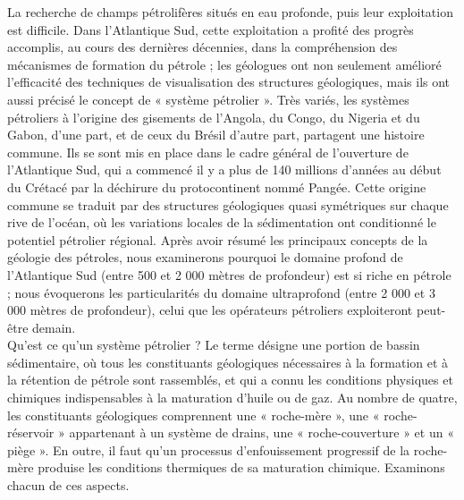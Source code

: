 \documentclass[8pt]{article}
\begin{document}
La recherche de champs pétrolifères situés en eau profonde, puis leur exploitation est difficile. Dans l'Atlantique Sud, cette exploitation a profité des progrès accomplis, au cours des dernières décennies, dans la compréhension des mécanismes de formation du pétrole ; les géologues ont non seulement amélioré l'efficacité des techniques de visualisation des structures géologiques, mais ils ont aussi précisé le concept de « système pétrolier ». Très variés, les systèmes pétroliers à l'origine des gisements de l'Angola, du Congo, du Nigeria et du Gabon, d'une part, et de ceux du Brésil d'autre part, partagent une histoire commune. Ils se sont mis en place dans le cadre général de l'ouverture de l'Atlantique Sud, qui a commencé il y a plus de 140 millions d'années au début du Crétacé par la déchirure du protocontinent nommé Pangée. Cette origine commune se traduit par des structures géologiques quasi symétriques sur chaque rive de l'océan, où les variations locales de la sédimentation ont conditionné le potentiel pétrolier régional. Après avoir résumé les principaux concepts de la géologie des pétroles, nous examinerons pourquoi le domaine profond de l'Atlantique Sud (entre 500 et 2 000 mètres de profondeur) est si riche en pétrole ; nous évoquerons les particularités du domaine ultraprofond (entre 2 000 et 3 000 mètres de profondeur), celui que les opérateurs pétroliers exploiteront peut-être demain.\\

Qu'est ce qu'un système pétrolier ? Le terme désigne une portion de bassin sédimentaire, où tous les constituants géologiques nécessaires à la formation et à la rétention de pétrole sont rassemblés, et qui a connu les conditions physiques et chimiques indispensables à la maturation d'huile ou de gaz. Au nombre de quatre, les constituants géologiques comprennent une « roche-mère », une « roche-réservoir » appartenant à un système de drains, une « roche-couverture » et un « piège ». En outre, il faut qu'un processus d'enfouissement progressif de la roche-mère produise les conditions thermiques de sa maturation chimique. Examinons chacun de ces aspects.\\
\end{document}
